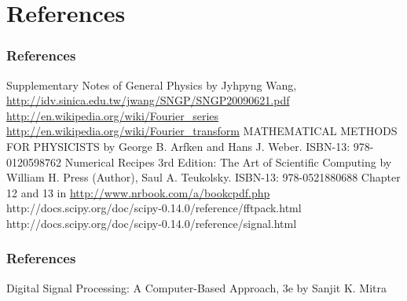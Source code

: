 \documentclass{beamer}
\begin{document}
\section{References}
\begin{frame}
\frametitle{References}
\begin{thebibliography}{7}
 Supplementary Notes of General Physics by Jyhpyng Wang, \url{http://idv.sinica.edu.tw/jwang/SNGP/SNGP20090621.pdf}
 \url{http://en.wikipedia.org/wiki/Fourier_series}
 \url{http://en.wikipedia.org/wiki/Fourier_transform}
 MATHEMATICAL METHODS FOR PHYSICISTS by George B. Arfken and Hans J. Weber. ISBN-13: 978-0120598762
 Numerical Recipes 3rd Edition: The Art of Scientific Computing by William H. Press  (Author), Saul A. Teukolsky. ISBN-13: 978-0521880688
 Chapter 12 and 13 in \url{http://www.nrbook.com/a/bookcpdf.php}
http://docs.scipy.org/doc/scipy-0.14.0/reference/fftpack.html
http://docs.scipy.org/doc/scipy-0.14.0/reference/signal.html
\end{thebibliography}
\end{frame}
\begin{frame}
\frametitle{References}
\begin{thebibliography}{1}
 Digital Signal Processing: A Computer-Based Approach, 3e by Sanjit K. Mitra
\end{thebibliography}
\end{frame}
\section{}
\end{document}
